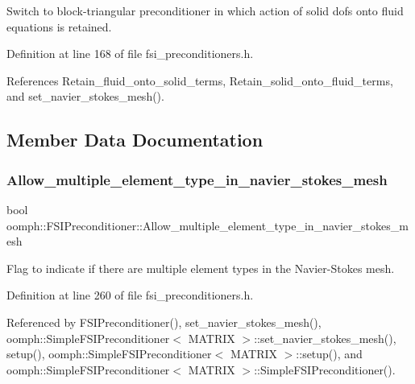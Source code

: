 Switch to block-\/triangular preconditioner in which action of solid dofs onto fluid equations is retained. 



Definition at line 168 of file fsi\+\_\+preconditioners.\+h.



References Retain\+\_\+fluid\+\_\+onto\+\_\+solid\+\_\+terms, Retain\+\_\+solid\+\_\+onto\+\_\+fluid\+\_\+terms, and set\+\_\+navier\+\_\+stokes\+\_\+mesh().



\subsection{Member Data Documentation}
\mbox{\label{classoomph_1_1FSIPreconditioner_a4c015d18092bf2bfc1db075c74006e80}} 
\subsubsection{\texorpdfstring{Allow\+\_\+multiple\+\_\+element\+\_\+type\+\_\+in\+\_\+navier\+\_\+stokes\+\_\+mesh}{Allow\_multiple\_element\_type\_in\_navier\_stokes\_mesh}}
{\footnotesize\ttfamily bool oomph\+::\+F\+S\+I\+Preconditioner\+::\+Allow\+\_\+multiple\+\_\+element\+\_\+type\+\_\+in\+\_\+navier\+\_\+stokes\+\_\+mesh\hspace{0.3cm}{\ttfamily [private]}}

Flag to indicate if there are multiple element types in the Navier-\/\+Stokes mesh. 

Definition at line 260 of file fsi\+\_\+preconditioners.\+h.



Referenced by F\+S\+I\+Preconditioner(), set\+\_\+navier\+\_\+stokes\+\_\+mesh(), oomph\+::\+Simple\+F\+S\+I\+Preconditioner$<$ M\+A\+T\+R\+I\+X $>$\+::set\+\_\+navier\+\_\+stokes\+\_\+mesh(), setup(), oomph\+::\+Simple\+F\+S\+I\+Preconditioner$<$ M\+A\+T\+R\+I\+X $>$\+::setup(), and oomph\+::\+Simple\+F\+S\+I\+Preconditioner$<$ M\+A\+T\+R\+I\+X $>$\+::\+Simple\+F\+S\+I\+Preconditioner().

